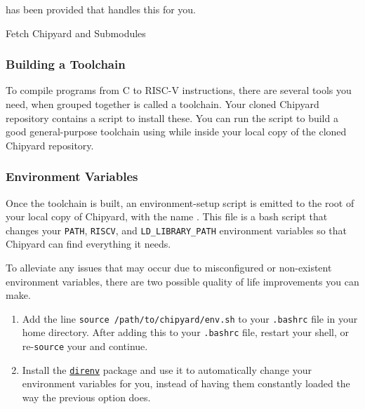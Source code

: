  has been provided that handles this for you.

\begin{listing}[h!tbp]
\caption{Fetch Chipyard and Submodules}
\label{lst:Fetch_Chipyard_and_Submodules}
\end{listing}

\subsubsection{Building a Toolchain}\label{sec:Building_Toolchain}
To compile programs from C to RISC-V instructions, there are several tools you need, when grouped together is called a toolchain.
Your cloned Chipyard repository contains a script to install these.
You can run the script to build a good general-purpose toolchain using  while inside your local copy of the cloned Chipyard repository.

\subsubsection{Environment Variables}\label{sec:Environment_Variables}
Once the toolchain is built, an environment-setup script is emitted to the root of your local copy of Chipyard, with the name .
This file is a bash script that changes your \texttt{PATH}, \texttt{RISCV}, and \texttt{LD\_LIBRARY\_PATH} environment variables so that Chipyard can find everything it needs.

To alleviate any issues that may occur due to misconfigured or non-existent environment variables, there are two possible quality of life improvements you can make.
\begin{enumerate}
\item Add the line \texttt{source /path/to/chipyard/env.sh} to your \texttt{.bashrc} file in your home directory.
  After adding this to your \texttt{.bashrc} file, restart your shell, or re-\texttt{source} your  and continue.
\item Install the \href{https://direnv.net/}{\texttt{direnv}} package and use it to automatically change your environment variables for you, instead of having them constantly loaded the way the previous option does.
\end{enumerate}

